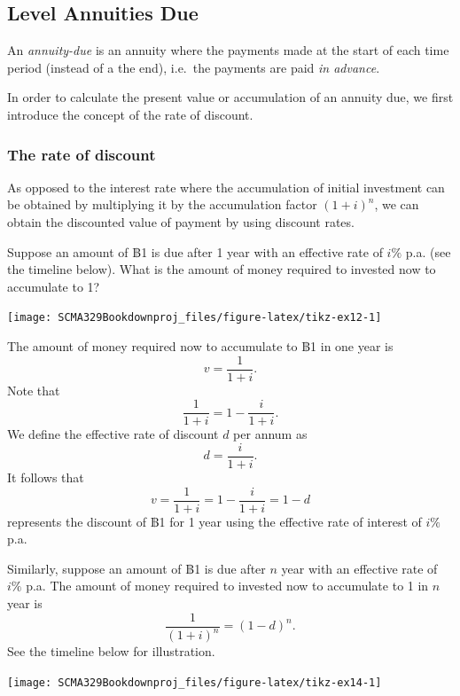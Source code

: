 \documentclass[
]{book}
\theoremstyle{definition}
\theoremstyle{definition}
\theoremstyle{definition}
\theoremstyle{definition}
\theoremstyle{remark}
\begin{document}
\hypertarget{level-annuities-due}{%
\subsection{Level Annuities Due}\label{level-annuities-due}}

An \emph{annuity-due} is an annuity where the payments made at the start of
each time period (instead of a the end), i.e.~the payments are paid \emph{in
advance}.

In order to calculate the present value or accumulation of an annuity
due, we first introduce the concept of the rate of discount.

\hypertarget{the-rate-of-discount}{%
\subsubsection*{The rate of discount}\label{the-rate-of-discount}}

As opposed to the interest rate where the accumulation of initial
investment can be obtained by multiplying it by the accumulation factor
\((1+i)^n\), we can obtain the discounted value of payment by using
discount rates.

Suppose an amount of ฿1 is due after 1 year with an effective rate of
\(i \%\) p.a. (see the timeline below). What is the amount of money
required to invested now to accumulate to 1?

\begin{center}\texttt{[image: SCMA329Bookdownproj\_files/figure-latex/tikz-ex12-1]} \end{center}

The amount of money required now to accumulate to ฿1 in one year is
\[v =  \frac{1}{1+i}.\] Note that \[\frac{1}{1+i} = 1 - \frac{i}{1+i}.\]
We define the effective rate of discount \(d\) per annum
as\[d = \frac{i}{1+i}.\] It follows that
\[v = \frac{1}{1+i} = 1 - \frac{i}{1+i} =  1 - d\] represents the
discount of ฿1 for 1 year using the effective rate of interest of \(i \%\)
p.a.

Similarly, suppose an amount of ฿1 is due after \(n\) year with an
effective rate of \(i \%\) p.a. The amount of money required to invested
now to accumulate to 1 in \(n\) year is \[\frac{1}{(1+i)^n} = (1-d)^n.\]
See the timeline below for illustration.

\begin{center}\texttt{[image: SCMA329Bookdownproj\_files/figure-latex/tikz-ex14-1]} \end{center}
\end{document}
